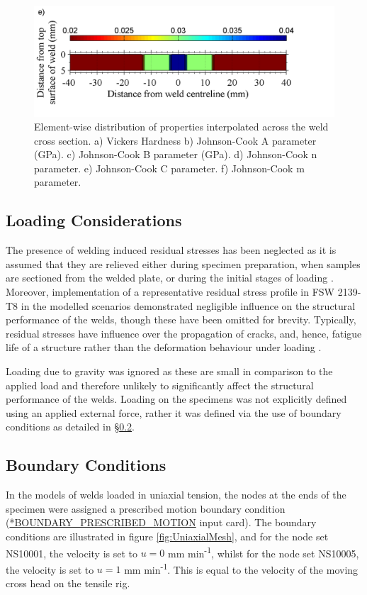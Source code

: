 \begin{figure}
	\includegraphics[width=1\linewidth]{JCCaltered}
	\caption[Mesh]{Element-wise distribution of properties interpolated across the weld cross section. a) Vickers Hardness b) Johnson-Cook A parameter (GPa). c) Johnson-Cook B parameter (GPa). d) Johnson-Cook n parameter. e) Johnson-Cook C parameter. f) Johnson-Cook m parameter.}
	\label{fig:colormaps}
\end{figure} 

\subsection{Loading Considerations}
\label{FELoadingConsiderations}
The presence of welding induced residual stresses has been neglected as it is assumed that they are relieved either during specimen preparation, when samples are sectioned from the welded plate, or during the initial stages of loading \cite{Peel2003}. Moreover, implementation of a representative residual stress profile in FSW 2139-T8 \cite{Grujicic2011a} in the modelled scenarios demonstrated negligible influence on the structural performance of the welds, though these have been omitted for brevity. Typically, residual stresses have influence over the propagation of cracks, and, hence, fatigue life of a structure rather than the deformation behaviour under loading \cite{Jata2000}. 

Loading due to gravity was ignored as these are small in comparison to the applied load and therefore unlikely to significantly affect the structural performance of the welds. Loading on the specimens was not explicitly defined using an applied external force, rather it was defined via the use of boundary conditions as detailed in \S\ref{FEBoundaryConditions}.

\subsection{Boundary Conditions}
\label{FEBoundaryConditions}
In the models of welds loaded in uniaxial tension, the nodes at the ends of the specimen were assigned a prescribed motion boundary condition (\url{*BOUNDARY_PRESCRIBED_MOTION} input card). The boundary conditions are illustrated in figure \ref{fig:UniaxialMesh}, and for the node set %
NS10001, the velocity is set to \textit{$u=0$} mm min\textsuperscript{-1}, whilst for the node set
NS10005, the velocity is set to \textit{$u=1$} mm min\textsuperscript{-1}. This is equal to the velocity of the moving cross head on the tensile rig.

